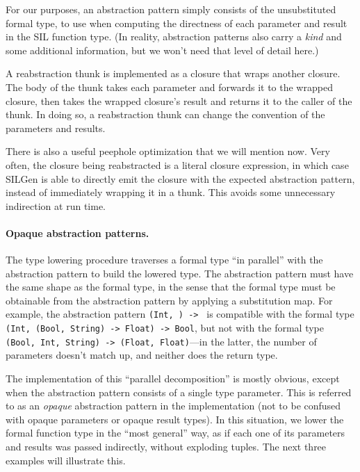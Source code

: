 \documentclass[../generics]{subfiles}
\begin{document}
For our purposes, an abstraction pattern simply consists of the unsubstituted formal type, to use when computing the directness of each parameter and result in the SIL function type. (In reality, abstraction patterns also carry a \emph{kind} and some additional information, but we won't need that level of detail here.)

A reabstraction thunk is implemented as a closure that wraps another closure. The body of the thunk takes each parameter and forwards it to the wrapped closure, then takes the wrapped closure's result and returns it to the caller of the thunk. In doing so, a reabstraction thunk can change the convention of the parameters and results.

There is also a useful peephole optimization that we will mention now. Very often, the closure being reabstracted is a literal closure expression, in which case SILGen is able to directly emit the closure with the expected abstraction pattern, instead of immediately wrapping it in a thunk. This avoids some unnecessary indirection at run time.

\paragraph{Opaque abstraction patterns.}
The type lowering procedure traverses a formal type ``in parallel'' with the abstraction pattern to build the lowered type. The abstraction pattern must have the same shape as the formal type, in the sense that the formal type must be obtainable from the abstraction pattern by applying a substitution map. For example, the abstraction pattern \texttt{(Int, \rU) -> \rV} is compatible with the formal type \texttt{(Int, (Bool, String) -> Float) -> Bool}, but not with the formal type \texttt{(Bool, Int, String) -> (Float, Float)}---in the latter, the number of parameters doesn't match up, and neither does the return type.

The implementation of this ``parallel decomposition'' is mostly obvious, except when the abstraction pattern consists of a single type parameter. This is referred to as an \emph{opaque} abstraction pattern in the implementation (not to be confused with opaque parameters or opaque result types). In this situation, we lower the formal function type in the ``most general'' way, as if each one of its parameters and results was passed indirectly, without exploding tuples. The next three examples will illustrate this.
\end{document}
